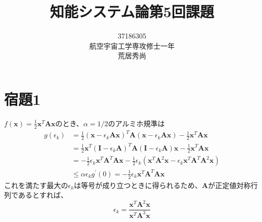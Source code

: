 \documentclass[10pt,a4paper]{ltjsarticle}       %
\title{知能システム論第5回課題}
\author{37186305\\航空宇宙工学専攻修士一年\\荒居秀尚}
\begin{document}
    \maketitle
    \section{宿題1}
    $f(\bm{x}) = \frac{1}{2}\bm{x}^{T}\bm{A}\bm{x}$のとき、$\alpha=1/2$のアルミホ規準は
    \begin{align}
      g(\epsilon_k) &= \frac{1}{2} (\bm{x} - \epsilon_k \bm{A}\bm{x})^{T} \bm{A} (\bm{x} - \epsilon_k \bm{A} \bm{x}) - \frac{1}{2} \bm{x}^{T} \bm{A} \bm{x} \\
                          &= \frac{1}{2} \bm{x}^{T} (\bm{I} - \epsilon_k \bm{A})^{T} \bm{A} (\bm{I} - \epsilon_k \bm{A}) \bm{x} -  \frac{1}{2} \bm{x}^{T} \bm{A} \bm{x} \\
                          &= -\frac{1}{2} \epsilon_k \bm{x}^{T} \bm{A}^{T} \bm{A} \bm{x} - \frac{1}{2} \epsilon_k (\bm{x}^{T} \bm{A}^2 \bm{x} - \epsilon_k \bm{x}^T \bm{A}^T \bm{A}^2 \bm{x}) \\
                          &\le \alpha \epsilon_k g^{\prime} (0) = -\frac{1}{2} \epsilon_k \bm{x}^{T} \bm{A}^{T} \bm{A} \bm{x}
    \end{align}
    これを満たす最大の$\epsilon_k$は等号が成り立つときに得られるため、$\bm{A}$が正定値対称行列であるとすれば、
    \begin{equation}
    \epsilon_k = \frac{\bm{x}^T\bm{A}^2\bm{x}}{\bm{x}^T\bm{A}^3\bm{x}}
    \end{equation}
    
\end{document}
